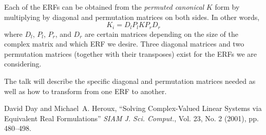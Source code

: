 \documentclass{report}
\begin{document}
Each of the ERFs can be obtained from the \emph{permuted canonical} $K$
form by multiplying by diagonal and permutation matrices on both sides.
In other words,
\begin{equation*} \label{kiform} K_i = D_l P_l K P_r D_r \end{equation*}
where $D_l$, $P_l$, $P_r$, and $D_r$ are certain matrices depending on
the size of the complex matrix and which ERF we desire. Three diagonal
matrices and two permutation matrices (together with their transposes)
exist for the ERFs we are considering.

The talk will describe the specific diagonal and permutation
matrices needed as well as how to transform from one ERF to another.

\begin{thebibliography}{1}
David Day and Michael~A. Heroux, ``Solving Complex-Valued Linear
Systems via Equivalent Real Formulations'' \emph{SIAM J. Sci.
Comput.}, Vol. 23, No. 2 (2001), pp. 480--498.
\end{thebibliography}
\end{document}
